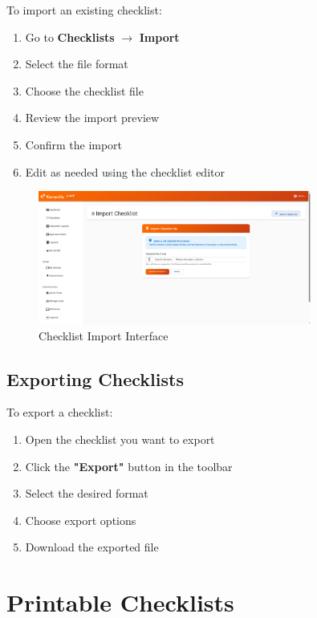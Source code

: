 To import an existing checklist:

\begin{enumerate}
    \item Go to \textbf{Checklists} $\rightarrow$ \textbf{Import}
    \item Select the file format
    \item Choose the checklist file
    \item Review the import preview
    \item Confirm the import
    \item Edit as needed using the checklist editor
\end{enumerate}

\begin{figure}[H]
\centering
\includegraphics[width=0.8\textwidth]{images/checklist_import.png}
\caption{Checklist Import Interface}
\label{fig:checklist_import}
\end{figure}

\subsection{Exporting Checklists}

To export a checklist:

\begin{enumerate}
    \item Open the checklist you want to export
    \item Click the \textbf{"Export"} button in the toolbar
    \item Select the desired format
    \item Choose export options
    \item Download the exported file
\end{enumerate}

\section{Printable Checklists}

